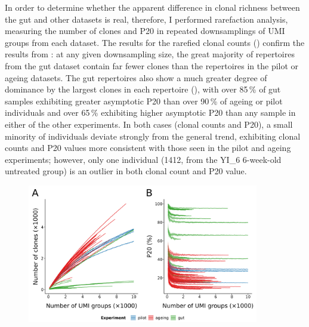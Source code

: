 In order to determine whether the apparent difference in clonal richness between the gut and other datasets is real, therefore, I performed rarefaction analysis, measuring the number of clones and P20 in repeated downsamplings of UMI groups from each dataset. The results for the rarefied clonal counts () confirm the results from : at any given downsampling size, the great majority of repertoires from the gut dataset contain far fewer clones than the repertoires in the pilot or ageing datasets. The gut repertoires also show a much greater degree of dominance by the largest clones in each repertoire (), with over 85\,\% of gut samples exhibiting greater asymptotic P20 than over 90\,\% of ageing or pilot individuals and over 65\,\% exhibiting higher asymptotic P20 than any sample in either of the other experiments. In both cases (clonal counts and P20), a small minority of individuals deviate strongly from the general trend, exhibiting clonal counts and P20 values more consistent with those seen in the pilot and ageing experiments; however, only one individual (1412, from the YI\_6 6-week-old untreated group) is an outlier in both clonal count and P20 value.

\begin{figure}
\centering
\includegraphics[width = 0.9\textwidth]{_Figures/png/igseq-rarefied-clones}
\begin{subfigure}{0em}
\label{fig:igseq-rarefied-clone-counts}
\end{subfigure}
\begin{subfigure}{0em}
\label{fig:igseq-rarefied-clone-p20}
\end{subfigure}
\label{fig:igseq-rarefied-clones}
\end{figure}

